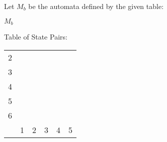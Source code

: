 Let $M_b$ be the automata defined by the given table:
\begin{automata}{$M_b$}
	
	
	
	
	
	
	
	
\end{automata}

Table of State Pairs: \\
\begin{center} \begin{tabular}{*{6}{c|}}
									\cline{1-2}
	2 &  						\\	\cline{1-3}
	3 &   &  					\\	\cline{1-4}
	4 &   &   &  				\\	\cline{1-5}
	5 &   &   &   &  			\\	\cline{1-6}
	6 &   &   &   &   &  		\\	\hline
	  & 1 & 2 & 3 & 4 & 5		\\
\end{tabular} \end{center}